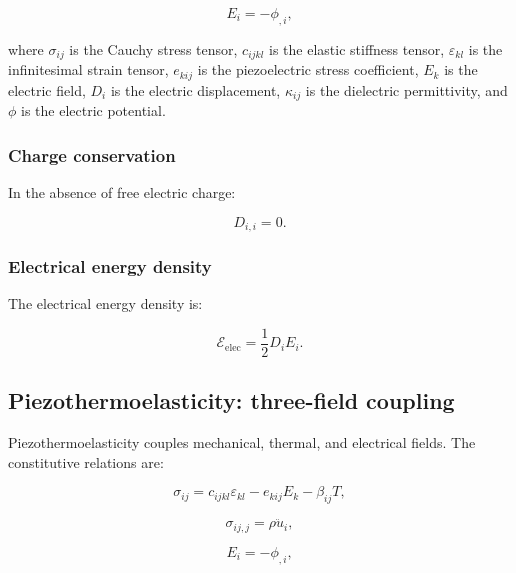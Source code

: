 \begin{equation}
E_i = -\phi_{,i},
\label{eq:5.3}
\end{equation}

where $\sigma_{ij}$ is the Cauchy stress tensor, $c_{ijkl}$ is the elastic stiffness tensor, $\varepsilon_{kl}$ is the infinitesimal strain tensor, $e_{kij}$ is the piezoelectric stress coefficient, $E_k$ is the electric field, $D_i$ is the electric displacement, $\kappa_{ij}$ is the dielectric permittivity, and $\phi$ is the electric potential.

\subsubsection{Charge conservation}

In the absence of free electric charge:

\begin{equation}
D_{i,i} = 0.
\label{eq:5.4}
\end{equation}

\subsubsection{Electrical energy density}

The electrical energy density is:

\begin{equation}
\mathcal{E}_{\mathrm{elec}} = \frac{1}{2}D_i E_i.
\label{eq:5.5}
\end{equation}

\subsection{Piezothermoelasticity: three-field coupling}
\label{sec:5.2}

Piezothermoelasticity couples mechanical, thermal, and electrical fields. The constitutive relations are:

\begin{equation}
\sigma_{ij} = c_{ijkl}\varepsilon_{kl} - e_{kij}E_k - \beta_{ij}T,
\label{eq:5.6}
\end{equation}

\begin{equation}
\sigma_{ij,j} = \rho\ddot{u}_i,
\label{eq:5.7}
\end{equation}

\begin{equation}
E_i = -\phi_{,i},
\label{eq:5.8}
\end{equation}

